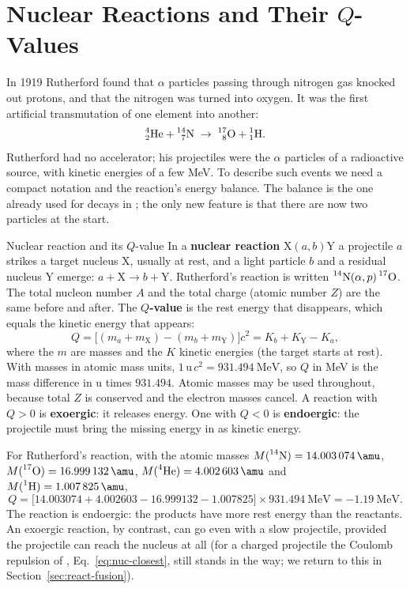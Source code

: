 \section{Nuclear Reactions and Their \texorpdfstring{$Q$}{Q}-Values}\label{sec:react-q}

In 1919 Rutherford found that $\alpha$ particles passing through nitrogen gas knocked out protons, and
that the nitrogen was turned into oxygen. It was the first artificial transmutation of one element into
another:
\[
\prescript{4}{2}{\mathrm{He}}+\prescript{14}{7}{\mathrm{N}}\;\to\;\prescript{17}{8}{\mathrm{O}}+\prescript{1}{1}{\mathrm{H}}.
\]
Rutherford had no accelerator; his projectiles were the $\alpha$ particles of a radioactive source, with
kinetic energies of a few MeV. To describe such events we need a compact notation and the reaction's
energy balance. The balance is the one already used for decays in ; the only new feature
is that there are now two particles at the start.

\begin{defbox}{Nuclear reaction and its \texorpdfstring{$Q$}{Q}-value}
In a \textbf{nuclear reaction} $\mathrm{X}(a,b)\mathrm{Y}$ a projectile $a$ strikes a target nucleus
X, usually at rest, and a light particle $b$ and a residual nucleus Y emerge:
$a+\mathrm{X}\to b+\mathrm{Y}$. Rutherford's reaction is written $\prescript{14}{}{\mathrm{N}}(\alpha,p)\prescript{17}{}{\mathrm{O}}$.
The total nucleon number $A$ and the total charge (atomic number $Z$) are the same before and after. The
\textbf{$Q$-value} is the rest energy that disappears, which equals the kinetic energy that appears:
\[
Q=\big[(m_a+m_{\mathrm X})-(m_b+m_{\mathrm Y})\big]c^2=K_b+K_{\mathrm Y}-K_a ,
\]
where the $m$ are masses and the $K$ kinetic energies (the target starts at rest). With masses in
atomic mass units, $1\,\si{\amu}\,c^2=\SI{931.494}{\MeV}$, so $Q$ in MeV is the mass difference in
\si{\amu} times $931.494$. Atomic masses may be used throughout, because total $Z$ is conserved and the
electron masses cancel. A reaction with $Q>0$ is \textbf{exoergic}: it releases energy. One with $Q<0$
is \textbf{endoergic}: the projectile must bring the missing energy in as kinetic energy.
\end{defbox}

For Rutherford's reaction, with the atomic masses $M(\iso{14}{N})=\SI{14.003074}{\amu}$,
$M(\iso{17}{O})=\SI{16.999132}{\amu}$, $M(\iso{4}{He})=\SI{4.002603}{\amu}$ and
$M(\iso{1}{H})=\SI{1.007825}{\amu}$,
\[
Q=\big[\num{14.003074}+\num{4.002603}-\num{16.999132}-\num{1.007825}\big]\times\SI{931.494}{\MeV}
=-\SI{1.19}{\MeV}.
\]
The reaction is endoergic: the products have more rest energy than the reactants. An exoergic reaction,
by contrast, can go even with a slow projectile, provided the projectile can reach the nucleus at all
(for a charged projectile the Coulomb repulsion of , Eq.~\eqref{eq:nuc-closest}, still stands in the way; we return
to this in Section~\ref{sec:react-fusion}).

